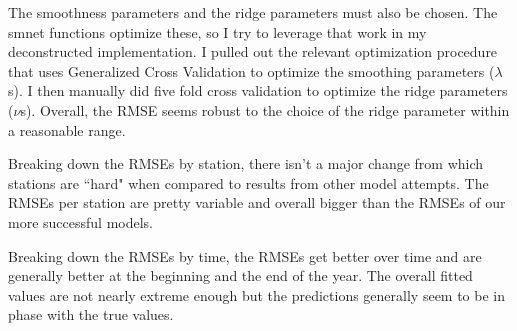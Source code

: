 \documentclass[12pt]{amsart}
\begin{document}
The smoothness parameters and the ridge parameters must also be chosen. The smnet functions optimize these, so I try to leverage that work in my deconstructed implementation. I pulled out the relevant optimization procedure that uses Generalized Cross Validation to optimize the smoothing parameters ($\lambda$s). I then manually did five fold cross validation to optimize the ridge parameters ($\nu$s). Overall, the RMSE seems robust to the choice of the ridge parameter within a reasonable range. 

Breaking down the RMSEs by station, there isn't a major change from which stations are ``hard" when compared to results from other model attempts. The RMSEs per station are pretty variable and overall bigger than the RMSEs of our more successful models. 

Breaking down the RMSEs by time, the RMSEs get better over time and are generally better at the beginning and the end of the year. The overall fitted values are not nearly extreme enough but the predictions generally seem to be in phase with the true values.





\textbf{}
\end{document}
